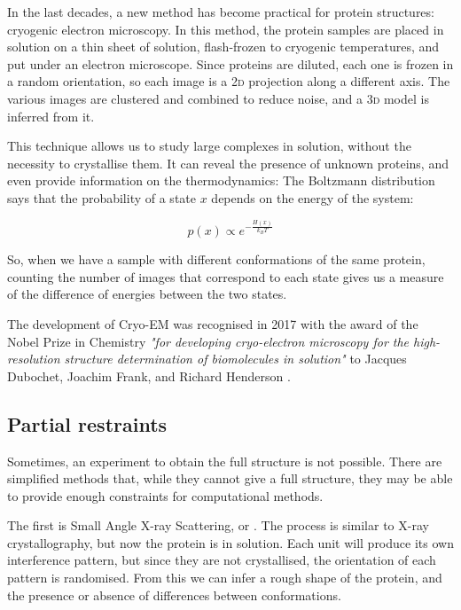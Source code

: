 In the last decades, 
a new method has become practical for protein structures: cryogenic electron microscopy.
In this method, the protein samples are placed in solution on a thin sheet of solution, flash-frozen to cryogenic temperatures, and put under an electron microscope.
Since proteins are diluted, each one is frozen in a random orientation, so each image is a \textsc{2d} projection along a different axis.
The various images are clustered and combined to reduce noise, and a \textsc{3d} model is inferred from it.

This technique allows us to study large complexes in solution, without the necessity to crystallise them.
It can reveal the presence of unknown proteins, and even provide information on the thermodynamics:
The Boltzmann distribution says that the probability of a state $x$ depends on the energy of the system:

\begin{equation*}
p(x) \propto e^{-\frac{H(x)}{k_B T}}
\end{equation*}

So, when we have a sample with different conformations of the same protein, counting the number of images that correspond to each state gives us a measure of the difference of energies between the two states.

The development of Cryo-EM was recognised in 2017 with the award of the Nobel Prize in Chemistry \emph{"for developing cryo-electron microscopy for the high-resolution structure determination of biomolecules in solution"} to Jacques Dubochet, Joachim Frank, and Richard Henderson  \citep{cryoEM_nobel}.


\subsection{Partial restraints}
Sometimes, an experiment to obtain the full structure is not possible.
There are simplified methods that, while they cannot give a full structure, they may be able to provide enough constraints for computational methods.

The first is Small Angle X-ray Scattering, or \SAXS. \marginpar{\SAXS}
The process is similar to X-ray crystallography, but now the protein is in solution.
Each unit will produce its own interference pattern, but since they are not crystallised, the orientation of each pattern is randomised.
From this we can infer a rough shape of the protein, and the presence or absence of differences between conformations.

